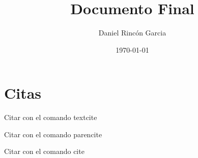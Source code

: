 \documentclass[12pt,a4paper]{article}
\title{Documento Final}
\author{Daniel Rincón Garcia}
\date{\today}
\begin{document}
\maketitle

\section{Citas}
Citar con el comando textcite
\textcite{alliance-for-water-stewardship-2019}

Citar con el comando parencite
\parencite{alliance-for-water-stewardship-2019}

Citar con el comando cite
\cite{alliance-for-water-stewardship-2019}



\printbibliography
\end{document}
